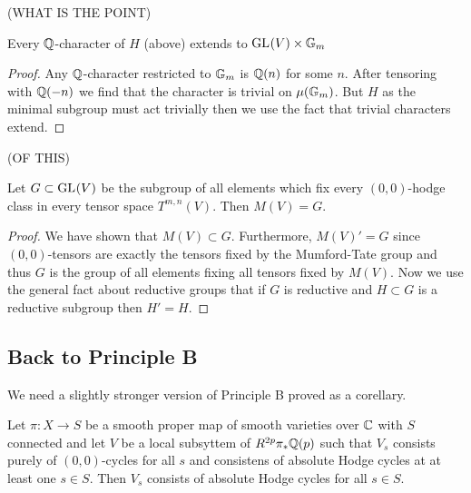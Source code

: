 \documentclass[12pt]{article}
\begin{document}
(WHAT IS THE POINT)

\begin{lemma}
Every $\mathbb{Q}$-character of $H$ (above) extends to $\mathrm{GL}_{}(V) \times \mathbb{G}_m$ 
\end{lemma}

\begin{proof}
Any $\mathbb{Q}$-character restricted to $\mathbb{G}_m$ is $\mathbb{Q}(n)$ for some $n$. After tensoring with $\mathbb{Q}(-n)$ we find that the character is trivial on $\mu(\mathbb{G}_m)$. But $H$ as the minimal subgroup must act trivially then we use the fact that trivial characters extend. 
\end{proof}

(OF THIS)

\begin{theorem}
Let $G \subset \mathrm{GL}_{}(V)$ be the subgroup of all elements which fix every $(0,0)$-hodge class in every tensor space $T^{m, n}(V)$. Then $M(V) = G$. 
\end{theorem}

\begin{proof}
We have shown that $M(V) \subset G$. Furthermore, $M(V)' = G$ since $(0,0)$-tensors are exactly the tensors fixed by the Mumford-Tate group and thus $G$ is the group of all elements fixing all tensors fixed by $M(V)$. Now we use the general fact about reductive groups that if $G$ is reductive and $H \subset G$ is a reductive subgroup then $H' = H$.
\end{proof}

\subsection{Back to Principle B}

\begin{remark}
We need a slightly stronger version of Principle B proved as a corellary.
\end{remark}

\begin{theorem}
Let $\pi : X \to S$ be a smooth proper map of smooth varieties over $\mathbb{C}$ with $S$ connected and let $V$ be a local subsyttem of $R^{2 p} \pi_* \mathbb{Q}(p)$ such that $V_s$ consists purely of $(0,0)$-cycles for all $s$ and consistens of absolute Hodge cycles at at least one $s \in S$. Then $V_s$ consists of absolute Hodge cycles for all $s \in S$.
\end{theorem}
\end{document}
